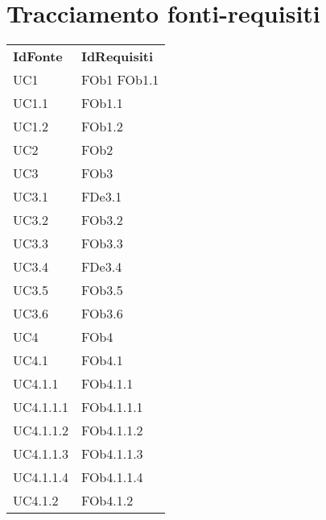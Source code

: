 \section{Tracciamento fonti-requisiti}
\begin{longtable}{|l|p{4cm}|}
\hline
\textbf{IdFonte} & \textbf{IdRequisiti} \\ 
		UC1 & FOb1 \linebreak  FOb1.1 \linebreak   \\
\hline
		UC1.1 & FOb1.1 \linebreak   \\
\hline
		UC1.2 & FOb1.2 \linebreak   \\
\hline
		UC2 & FOb2 \linebreak   \\
\hline
		UC3 & FOb3 \linebreak   \\
\hline
		UC3.1 & FDe3.1 \linebreak   \\
\hline
		UC3.2 & FOb3.2 \linebreak   \\
\hline
		UC3.3 & FOb3.3 \linebreak   \\
\hline
		UC3.4 & FDe3.4 \linebreak   \\
\hline
		UC3.5 & FOb3.5 \linebreak   \\
\hline
		UC3.6 & FOb3.6 \linebreak   \\
\hline
		UC4 & FOb4 \linebreak   \\
\hline
		UC4.1 & FOb4.1 \linebreak   \\
\hline
		UC4.1.1 & FOb4.1.1 \linebreak   \\
\hline
		UC4.1.1.1 & FOb4.1.1.1 \linebreak   \\
\hline
		UC4.1.1.2 & FOb4.1.1.2 \linebreak   \\
\hline
		UC4.1.1.3 & FOb4.1.1.3 \linebreak   \\
\hline
		UC4.1.1.4 & FOb4.1.1.4 \linebreak   \\
\hline
		UC4.1.2 & FOb4.1.2 \linebreak   \\

\end{longtable}
